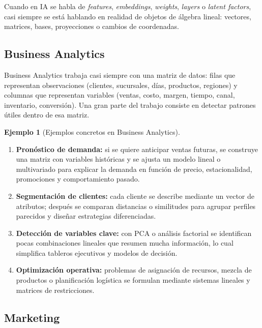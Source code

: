 \documentclass[10pt,a4paper,oneside]{article}
\theoremstyle{plain}
\theoremstyle{definition}
\newtheorem{example}[theorem]{Ejemplo}
\theoremstyle{remark}
\begin{document}
\begin{methodBox}
Cuando en IA se habla de \emph{features}, \emph{embeddings}, \emph{weights}, \emph{layers} o \emph{latent factors}, casi siempre se está hablando en realidad de objetos de álgebra lineal: vectores, matrices, bases, proyecciones o cambios de coordenadas.
\end{methodBox}

\subsection{Business Analytics}

Business Analytics trabaja casi siempre con una matriz de datos: filas que representan observaciones (clientes, sucursales, días, productos, regiones) y columnas que representan variables (ventas, costo, margen, tiempo, canal, inventario, conversión). Una gran parte del trabajo consiste en detectar patrones útiles dentro de esa matriz.

\begin{example}[Ejemplos concretos en Business Analytics]
\begin{enumerate}[label=\textup{(\arabic*)}]
\item \textbf{Pronóstico de demanda:} si se quiere anticipar ventas futuras, se construye una matriz con variables históricas y se ajusta un modelo lineal o multivariado para explicar la demanda en función de precio, estacionalidad, promociones y comportamiento pasado.
\item \textbf{Segmentación de clientes:} cada cliente se describe mediante un vector de atributos; después se comparan distancias o similitudes para agrupar perfiles parecidos y diseñar estrategias diferenciadas.
\item \textbf{Detección de variables clave:} con PCA o análisis factorial se identifican pocas combinaciones lineales que resumen mucha información, lo cual simplifica tableros ejecutivos y modelos de decisión.
\item \textbf{Optimización operativa:} problemas de asignación de recursos, mezcla de productos o planificación logística se formulan mediante sistemas lineales y matrices de restricciones.
\end{enumerate}
\end{example}

\subsection{Marketing}
\end{document}
